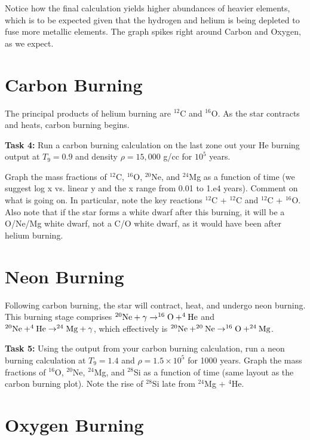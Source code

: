 \documentclass[manuscript]{aastex62}
\begin{document}
Notice how the final calculation yields higher abundances of heavier elements, which is to be expected given that the hydrogen and helium is being depleted to fuse more metallic elements. The graph spikes right around Carbon and Oxygen, as we expect.

\section{Carbon Burning} \label{sec:C}



The principal products of helium burning are $^{12}$C and $^{16}$O.  As the
star contracts and heats, carbon burning begins.

{\bf Task 4:}
Run a carbon burning calculation on the last zone out your He burning output
at $T_9 = 0.9$ and density
$\rho = 15,000$ g/cc for $10^5$ years.

Graph the mass fractions of $^{12}$C,
$^{16}$O, $^{20}$Ne, and $^{24}$Mg as a function of time (we suggest log x vs.
linear y and the x range from 0.01 to 1.e4 years).  Comment on what is going
on.  In particular, note the key reactions $^{12}$C + $^{12}$C and $^{12}$C +
$^{16}$O.  Also note that if the star forms a white dwarf after this burning,
it will be a O/Ne/Mg white dwarf, not a C/O white dwarf, as it would have
been after helium burning.

\section{Neon Burning} \label{sec:Ne}

Following carbon burning, the star will contract, heat, and undergo neon
burning.  This burning stage comprises $^{20}{\rm Ne} + \gamma \to ^{16}{\rm O}
+ ^4{\rm He}$ and $^{20}{\rm Ne} + ^4{\rm He} \to ^{24}{\rm Mg} + \gamma$,
which effectively is $^{20}{\rm Ne} + ^{20}{\rm Ne} \to ^{16}{\rm O} +
^{24}{\rm Mg}$.

{\bf Task 5:}
Using the output from your carbon burning calculation, run a neon burning
calculation at $T_9 = 1.4$ and $\rho = 1.5 \times 10^5$ for 1000 years.
Graph the mass fractions of $^{16}$O, $^{20}$Ne, $^{24}$Mg, and $^{28}$Si
as a function of time (same layout as the carbon burning plot).  Note
the rise of $^{28}$Si late from $^{24}$Mg + $^4$He.

\section{Oxygen Burning} \label{sec:O}
\end{document}
